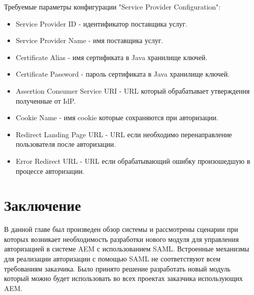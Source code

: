 Требуемые параметры конфигурации "Service Provider Configuration":
\begin{itemize}
\item Service Provider ID - идентификатор поставщика услуг.
\item Service Provider Name - имя поставщика услуг.
\item Certificate Alias - имя сертификата в Java хранилище ключей.
\item Certificate Password - пароль сертификата в Java хранилище ключей.
\item Assertion Consumer Service URI - URL который обрабатывает утверждения полученные от IdP.
\item Cookie Name - имя cookie которые сохраняются при авторизации.
\item Redirect Landing Page URL - URL если необходимо перенаправление пользователя после авторизации.
\item Error Redirect URL - URL если обрабатывающий ошибку произошедшую в процессе авторизации.
\end{itemize}

\section{Заключение}
В данной главе был произведен обзор системы и рассмотрены сценарии при которых возникает необходимость разработки нового модуля для управления авторизацией в системе AEM с использованием SAML. Встроенные механизмы для реализации авторизации с помощью SAML не соответствуют всем требованиям заказчика. Было принято решение разработать новый модуль который можно будет использовать во всех проектах заказчика использующих AEM.


